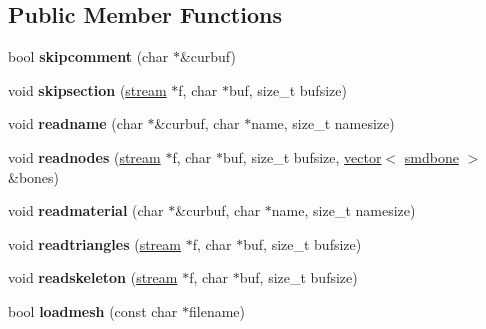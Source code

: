 \subsection*{Public Member Functions}
\begin{DoxyCompactItemize}
\item 
\mbox{\label{structsmd_1_1smdmeshgroup_ad29f8b3464db8802dc802b2c0b674b79}} 
bool {\bfseries skipcomment} (char $\ast$\&curbuf)
\item 
\mbox{\label{structsmd_1_1smdmeshgroup_a356be46fd8311d4fa5b3ad065445b011}} 
void {\bfseries skipsection} (\hyperlink{structstream}{stream} $\ast$f, char $\ast$buf, size\+\_\+t bufsize)
\item 
\mbox{\label{structsmd_1_1smdmeshgroup_addf2eb06e5339408fa204a159b899a63}} 
void {\bfseries readname} (char $\ast$\&curbuf, char $\ast$name, size\+\_\+t namesize)
\item 
\mbox{\label{structsmd_1_1smdmeshgroup_a2898023113ce41637d1b34d35c50523a}} 
void {\bfseries readnodes} (\hyperlink{structstream}{stream} $\ast$f, char $\ast$buf, size\+\_\+t bufsize, \hyperlink{structvector}{vector}$<$ \hyperlink{structsmdbone}{smdbone} $>$ \&bones)
\item 
\mbox{\label{structsmd_1_1smdmeshgroup_a2ca2e0c8ddab4702c3fec658ff10fb5c}} 
void {\bfseries readmaterial} (char $\ast$\&curbuf, char $\ast$name, size\+\_\+t namesize)
\item 
\mbox{\label{structsmd_1_1smdmeshgroup_a96a40e3e1ca09f119fc94f6e4e62070b}} 
void {\bfseries readtriangles} (\hyperlink{structstream}{stream} $\ast$f, char $\ast$buf, size\+\_\+t bufsize)
\item 
\mbox{\label{structsmd_1_1smdmeshgroup_a666cdf1de80648464b39a8bbab58f596}} 
void {\bfseries readskeleton} (\hyperlink{structstream}{stream} $\ast$f, char $\ast$buf, size\+\_\+t bufsize)
\item 
\mbox{\label{structsmd_1_1smdmeshgroup_ab72b1bcd312f16d69d5fb1f62956668f}} 
bool {\bfseries loadmesh} (const char $\ast$filename)

\end{DoxyCompactItemize}
